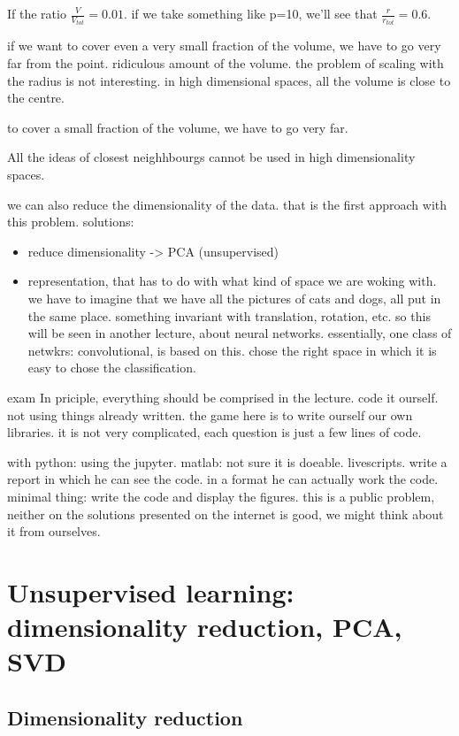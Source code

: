 \documentclass[a4paper]{tufte-book}
\begin{document}
If the ratio $\frac{V}{V_{tot}} = 0.01$.
if we take something like p=10, we'll see that $\frac{r}{r_{tot}} = 0.6$.

if we want to cover even a very small fraction of the volume, we have to go very
far from the point.
ridiculous amount of the volume.
the problem of scaling with the radius is not interesting.
in high dimensional spaces, all the volume is close to the centre.

to cover a small fraction of the volume, we have to go very far.

All the ideas of closest neighhbourgs cannot be used in high dimensionality
spaces.

we can also reduce the dimensionality of the data. that is the first approach
with this problem.
solutions:
\begin{itemize}
    \item reduce dimensionality -> PCA (unsupervised)
    \item representation, that has to do with what kind of space we are woking with. we have to imagine that we have all the pictures of cats and
        dogs, all put in the same place.
        something invariant with translation, rotation, etc. so this will be seen in another lecture, about neural networks. essentially, one
        class of netwkrs: convolutional, is based on this. chose the right space
        in which it is easy to chose the classification.
\end{itemize}

exam
In priciple, everything should be comprised in the lecture.
code it ourself. not using things already written. the game here is to write
ourself our own libraries. it is not very complicated, each question is just
a few lines of code.

with python: using the jupyter.
matlab: not sure it is doeable. livescripts.
write a report in which he can see the code. in a format he can actually work
the code.
minimal thing: write the code and display the figures.
this is a public problem, neither on the solutions presented on the internet is
good, we might think about it from ourselves.





\chapter{Unsupervised learning: dimensionality reduction, PCA, SVD}
\label{ch:unsupervised-1}

\section{Dimensionality reduction}
\end{document}
